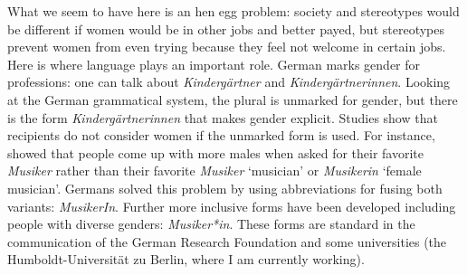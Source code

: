 What we seem to have here is an hen egg problem: society and stereotypes would be different if women
would be in other jobs and better payed, but stereotypes prevent women from even trying because they
feel not welcome in certain jobs. Here is where language plays an important role. German marks
gender for professions: one can talk about \emph{Kindergärtner} and
\emph{Kindergärtnerinnen}. Looking at the German grammatical system, the plural is unmarked for
gender, but there is the form \emph{Kindergärtnerinnen} that makes gender explicit. Studies show
that recipients do not consider women if the unmarked form is used. For instance, \citet{SSB2001a}
showed that people come up with more males when asked for their favorite \emph{Musiker} rather than
their favorite \emph{Musiker} `musician' or \emph{Musikerin} `female musician'. Germans solved this
problem by using abbreviations for fusing both variants: \emph{MusikerIn}. Further more inclusive
forms have been developed including people with diverse genders: \emph{Musiker*in}. These forms are
standard in the communication of the German Research Foundation and some universities (\eg the
Humboldt-Universität zu Berlin, where I am currently working).    


